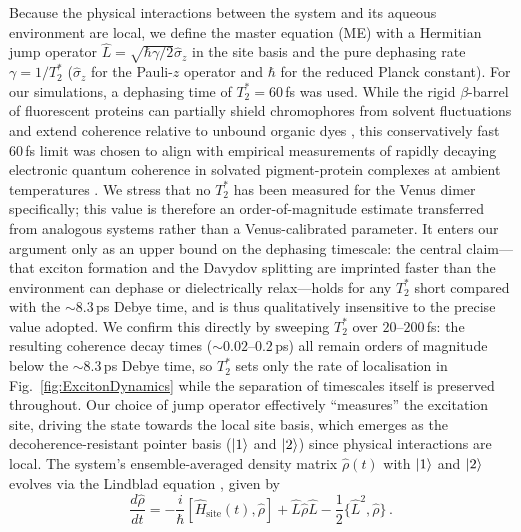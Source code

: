 \documentclass[journal=jpcbfk, manuscript=article, layout=twocolumn, doi=true]{achemso}
\begin{document}
Because the physical interactions between the system and its aqueous environment are local, we define the master equation (ME) with a Hermitian jump operator $\hat{L} = \sqrt{\hbar \gamma / 2} \hat{\sigma}_z$ in the site basis and the pure dephasing rate $\gamma = 1/T_2^*$ ($\hat{\sigma}_z$ for the Pauli-$z$ operator and $\hbar$ for the reduced Planck constant). For our simulations, a dephasing time of $T_2^* = 60$\,fs was used. While the rigid $\beta$-barrel of fluorescent proteins can partially shield chromophores from solvent fluctuations and extend coherence relative to unbound organic dyes \cite{kim2019venusa206}, this conservatively fast $60$\,fs limit was chosen to align with empirical measurements of rapidly decaying electronic quantum coherence in solvated pigment-protein complexes at ambient temperatures \cite{duan2017nature}. {We stress that no $T_2^*$ has been measured for the Venus dimer specifically; this value is therefore an order-of-magnitude estimate transferred from analogous systems rather than a Venus-calibrated parameter. It enters our argument only as an upper bound on the dephasing timescale: the central claim---that exciton formation and the Davydov splitting are imprinted faster than the environment can dephase or dielectrically relax---holds for any $T_2^*$ short compared with the $\sim 8.3$\,ps Debye time, and is thus qualitatively insensitive to the precise value adopted. We confirm this directly by sweeping $T_2^*$ over $20$--$200$\,fs: the resulting coherence decay times ($\sim 0.02$--$0.2$\,ps) all remain orders of magnitude below the $\sim 8.3$\,ps Debye time, so $T_2^*$ sets only the rate of localisation in Fig.~\ref{fig:ExcitonDynamics} while the separation of timescales itself is preserved throughout.} Our choice of jump operator effectively ``measures'' the excitation site, driving the state towards the local site basis, which emerges as the decoherence-resistant pointer basis ($\ket{1}$ and $\ket{2}$) since physical interactions are local. The system's ensemble-averaged density matrix $\hat{\rho}(t)$ with $\ket{1}$ and $\ket{2}$ evolves via the Lindblad equation \cite{manzano2020short}, given by
\begin{equation}
    \frac{d\hat{\rho}}{dt}=-\frac{i}{\hbar}[\hat H_{\text{site}}(t),\hat\rho] + \hat{L} \hat\rho \hat{L} - \frac{1}{2} \{\hat{L}^2, \hat\rho\}\,.
    \label{eq:ME01}
\end{equation}
\end{document}
